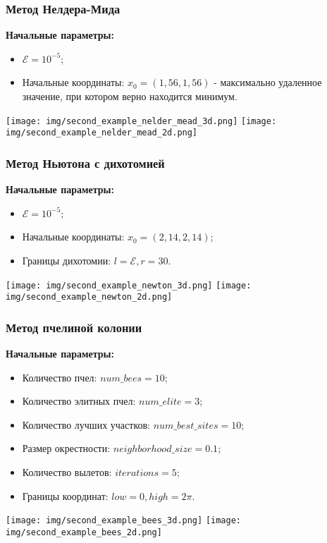 \documentclass{article}
\begin{document}
\subsubsection*{Метод Нелдера-Мида}
\textbf{Начальные параметры:}
\begin{itemize}
    \item $\mathcal{E} = 10^{-5}$;
    \item Начальные координаты: $x_0 = (1,56, 1,56)$ - максимально удаленное значение, при котором верно находится минимум.
\end{itemize}
\begin{center}
    \texttt{[image: img/second\_example\_nelder\_mead\_3d.png]}
    \texttt{[image: img/second\_example\_nelder\_mead\_2d.png]}
    \label{fig:enter-label}
\end{center}
\subsubsection*{Метод Ньютона с дихотомией}
\textbf{Начальные параметры:}
\begin{itemize}
    \item $\mathcal{E} = 10^{-5}$;
    \item Начальные координаты: $x_0 = (2,14, 2,14)$;
    \item Границы дихотомии: $l = \mathcal{E}, r = 30$.
\end{itemize}
\begin{center}
    \texttt{[image: img/second\_example\_newton\_3d.png]}
    \texttt{[image: img/second\_example\_newton\_2d.png]}
    \label{fig:enter-label}
\end{center}
\subsubsection*{Метод пчелиной колонии}
\textbf{Начальные параметры:}
\begin{itemize}
    \item Количество пчел: $num\_bees = 10$;
    \item Количество элитных пчел: $num\_elite = 3$;
    \item Количество лучших участков: $num\_best\_sites = 10$;
    \item Размер окрестности: $neighborhood\_size = 0.1$;
    \item Количество вылетов: $iterations = 5$;
    \item Границы координат: $low = 0, high = 2\pi$.
\end{itemize}
\begin{center}
    \texttt{[image: img/second\_example\_bees\_3d.png]}
    \texttt{[image: img/second\_example\_bees\_2d.png]}
    \label{fig:enter-label}
\end{center}
\end{document}
